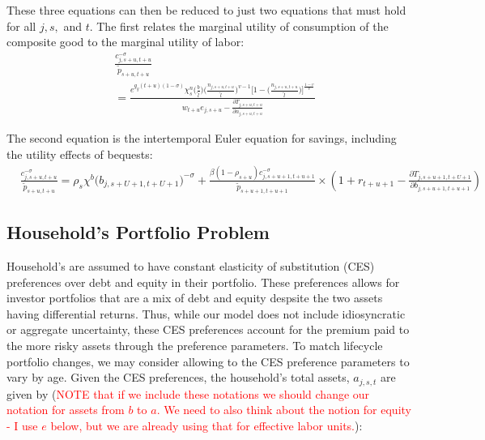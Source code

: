     These three equations can then be reduced to just two equations that must hold for all $j,s,$ and $t$.  The first relates the marginal utility of consumption of the composite good to the marginal utility of labor:
    \begin{equation}\label{EqcEuler}
      \begin{split}
      & \frac{ c_{j,s+u,t+u}^{-\sigma}}{\tilde{p}_{s+u,t+u}} \\
      & = \frac{ e^{g_y (t+u)(1-\sigma)}\chi^n_{s}\biggl(\frac{b}{\tilde{l}}\biggr)\biggl(\frac{n_{j,s+u,t+u}}{\tilde{l}}\biggr)^{v-1}\Biggl[1 - \biggl(\frac{n_{j,s+u,t+u}}{\tilde{l}}\biggr)\Biggr]^{\frac{1-v}{v}} } { w_{t+u} e_{j,s+u} - \frac{\partial T_{j,s+u,t+u}}{\partial n_{j,s+u,t+u}} }
       \end{split}
    \end{equation}

    \noindent\noindent The second equation is the intertemporal Euler equation for savings, including the utility effects of bequests:
    \begin{equation}\label{EqbEuler}
      \begin{split}
      & \frac{ c_{j,s+u,t+u}^{-\sigma}}{\tilde{p}_{s+u,t+u}} = \rho_s\chi^b\bigl(b_{j,s+U+1,t+U+1}\bigr)^{-\sigma}  + \frac{ \beta(1-\rho_{s+u}) c_{j,s+u+1,t+u+1}^{-\sigma}} {\tilde{p}_{s+u+1,t+u+1}} \times \left( 1 + r_{t+u+1} - \frac{\partial T_{j,s+u+1,t+U+1}}{\partial b_{j,s+u+1,t+u+1}} \right)
      \end{split}
    \end{equation}

   
    \subsection{Household's Portfolio Problem}\label{sec:portfolio}
    
Household's are assumed to have constant elasticity of substitution (CES) preferences over debt and equity in their portfolio.  These preferences allows for investor portfolios that are a mix of debt and equity despsite the two assets having differential returns.  Thus, while our model does not include idiosyncratic or aggregate uncertainty, these CES preferences account for the premium paid to the more risky assets through the preference parameters. To match lifecycle portfolio changes, we may consider allowing to the CES preference parameters to vary by age.  Given the CES preferences, the household's total assets, $a_{j,s,t}$ are given by (\textcolor{red}{NOTE that if we include these notations we should change our notation for assets from $b$ to $a$. We need to also think about the notion for equity - I use $e$ below, but we are already using that for effective labor units.}): 

